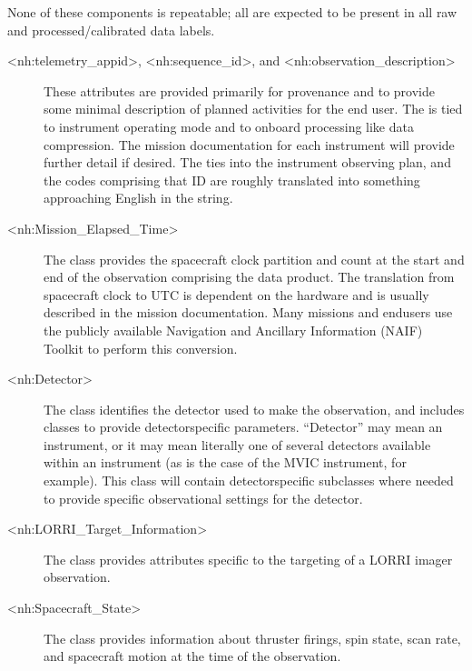 \documentclass[letterpaper,10pt,english]{sphinxmanual}
\begin{document}
\sphinxAtStartPar
None of these components is repeatable; all are expected to be present in all raw
and processed/calibrated data labels.
\begin{description}
\item[{\textless{}nh:telemetry\_appid\textgreater{}, \textless{}nh:sequence\_id\textgreater{}, and \textless{}nh:observation\_description\textgreater{}}] \leavevmode
\sphinxAtStartPar
These attributes are provided primarily for provenance and to provide some minimal
description of planned activities for the end user. The  is
tied to instrument operating mode and to onboard processing like data compression.
The mission documentation for each instrument will provide further detail
if desired. The  ties into the instrument observing plan, and
the codes comprising that ID are roughly translated into something approaching
English in the  string.

\item[{\textless{}nh:Mission\_Elapsed\_Time\textgreater{}}] \leavevmode
\sphinxAtStartPar
The  class provides the spacecraft clock partition and
count at the start and end of the observation comprising the data product.
The translation from spacecraft clock to UTC is dependent on the hardware and is
usually described in the mission documentation. Many missions and end\sphinxhyphen{}users use
the publicly available Navigation and Ancillary Information (NAIF) Toolkit to
perform this conversion.

\item[{\textless{}nh:Detector\textgreater{}}] \leavevmode
\sphinxAtStartPar
The  class identifies the detector used to make the observation,
and includes classes to provide detector\sphinxhyphen{}specific parameters. “Detector” may
mean an instrument, or it may mean literally one of several detectors available
within an instrument (as is the case of the MVIC instrument, for example). This
class will contain detector\sphinxhyphen{}specific subclasses where needed to provide specific
observational settings for the detector.

\item[{\textless{}nh:LORRI\_Target\_Information\textgreater{}}] \leavevmode
\sphinxAtStartPar
The  class provides attributes specific to the
targeting of a LORRI imager observation.

\item[{\textless{}nh:Spacecraft\_State\textgreater{}}] \leavevmode
\sphinxAtStartPar
The  class provides information about thruster firings,
spin state, scan rate, and spacecraft motion at the time of the observation.

\end{description}
\end{document}
